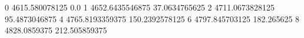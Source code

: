 0 4615.580078125 0.0
1 4652.6435546875 37.0634765625
2 4711.0673828125 95.4873046875
4 4765.8193359375 150.2392578125
6 4797.845703125 182.265625
8 4828.0859375 212.505859375
